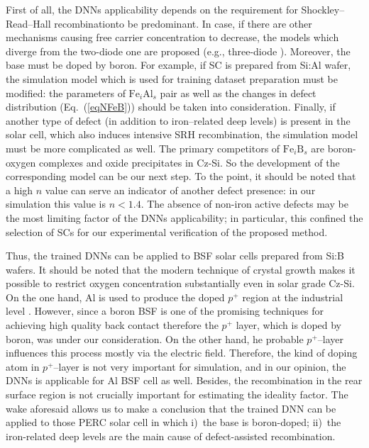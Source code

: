 \documentclass[num-refs]{wiley-article} %
\begin{document}
First of all, the DNNs applicability depends on the requirement for Shockley–Read–Hall recombinationto be predominant.
In case,
if there are other mechanisms causing free carrier concentration to decrease,
the models which diverge from the two-diode one are proposed
(e.g., three-diode \cite{TreeDiode,Shah}).
Moreover, the base must be doped by boron.
For example, if SC is prepared from Si:Al wafer,
the simulation model which is used for training dataset preparation must be modified:
the parameters of $\mathrm{Fe}_i\mathrm{Al}_s$ pair as well as
the changes in defect distribution (Eq.~(\ref{eqNFeB})) should be taken into consideration.
Finally, if another type of defect (in addition to iron--related deep levels)
is present in the solar cell, which also induces intensive SRH recombination,
the simulation model must be more complicated as well.
The primary competitors of $\mathrm{Fe}_i\mathrm{B}_s$  are  boron-oxygen complexes \cite{LIDRev,LIDRev2}
and oxide precipitates \cite{MurphySC2014,Oxide:Chen} in Cz-Si.
So the development of the corresponding model can be our next step.
To the point, it should be noted that a high $n$ value can serve an indicator of another defect presence:
in our simulation this value is $n<1.4$.
The absence of non-iron active defects may be the most limiting factor of the DNNs applicability;
in particular, this confined the selection of SCs for our experimental verification of the proposed method.


Thus, the trained DNNs can be applied to BSF solar cells prepared from Si:B wafers.
It should be noted that the modern  technique of crystal growth
makes it possible to restrict
oxygen concentration substantially even in solar grade Cz-Si.
On the one hand,  Al is used to produce the doped $p^+$ region
at the industrial level \cite{GreenRew2019,WilsonRew2020}.
However, since a boron BSF is one of the promising techniques
for achieving high quality back contact \cite{Kim2007,B-BSF}
therefore the $p^{+}$ layer, which is doped by boron, was under our consideration.
On the other hand,
he probable $p^+$--layer influences this process mostly via the electric field.
Therefore, the kind of doping atom in $p^+$--layer is not very important for simulation,
and in our opinion, the  DNNs is applicable for Al BSF cell as well.
Besides, the recombination in the rear surface region is not crucially important for estimating the ideality factor.
The wake aforesaid allows us to make a conclusion that
the trained DNN can be applied to those PERC solar cell in which
i)~the base is boron-doped;
ii)~the iron-related deep levels are the main cause of defect-assisted recombination.
\end{document}
